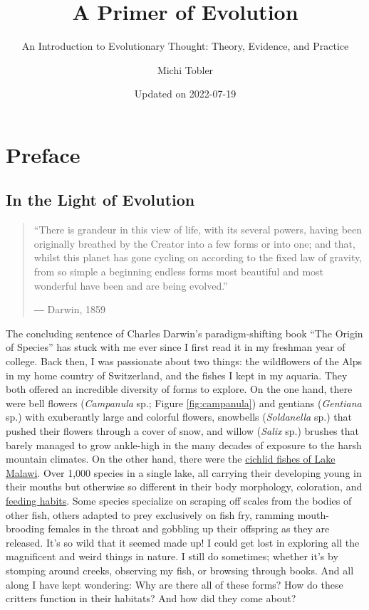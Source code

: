 \documentclass[
]{book}
\title{A Primer of Evolution}
\subtitle{An Introduction to Evolutionary Thought: Theory, Evidence, and Practice}
\author{Michi Tobler}
\date{Updated on 2022-07-19}
\begin{document}
\maketitle

{
\setcounter{tocdepth}{1}
\tableofcontents
}
\hypertarget{preface}{%
\chapter*{Preface}\label{preface}}

\hypertarget{in-the-light-of-evolution}{%
\section*{In the Light of Evolution}\label{in-the-light-of-evolution}}

\begin{quote}
``There is grandeur in this view of life, with its several powers, having been originally breathed by the Creator into a few forms or into one; and that, whilst this planet has gone cycling on according to the fixed law of gravity, from so simple a beginning endless forms most beautiful and most wonderful have been and are being evolved.''

― Darwin, 1859
\end{quote}

The concluding sentence of Charles Darwin's paradigm-shifting book ``The Origin of Species'' has stuck with me ever since I first read it in my freshman year of college. Back then, I was passionate about two things: the wildflowers of the Alps in my home country of Switzerland, and the fishes I kept in my aquaria. They both offered an incredible diversity of forms to explore. On the one hand, there were bell flowers (\emph{Campanula} sp.; Figure \ref{fig:campanula}) and gentians (\emph{Gentiana} sp.) with exuberantly large and colorful flowers, snowbells (\emph{Soldanella} sp.) that pushed their flowers through a cover of snow, and willow (\emph{Salix} sp.) brushes that barely managed to grow ankle-high in the many decades of exposure to the harsh mountain climates. On the other hand, there were the \href{https://malawicichlids.com/}{cichlid fishes of Lake Malawi}. Over 1,000 species in a single lake, all carrying their developing young in their mouths but otherwise so different in their body morphology, coloration, and \href{https://malawicichlids.com/mw01100.htm}{feeding habits}. Some species specialize on scraping off scales from the bodies of other fish, others adapted to prey exclusively on fish fry, ramming mouth-brooding females in the throat and gobbling up their offspring as they are released. It's so wild that it seemed made up! I could get lost in exploring all the magnificent and weird things in nature. I still do sometimes; whether it's by stomping around creeks, observing my fish, or browsing through books. And all along I have kept wondering: Why are there all of these forms? How do these critters function in their habitats? And how did they come about?
\end{document}
